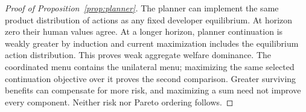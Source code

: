 \begin{proof}[Proof of Proposition~\ref{prop:planner}]
The planner can implement the same product distribution of actions as any fixed developer equilibrium. At horizon zero their human values agree. At a longer horizon, planner continuation is weakly greater by induction and current maximization includes the equilibrium action distribution. This proves weak aggregate welfare dominance. The coordinated menu contains the unilateral menu; maximizing the same selected continuation objective over it proves the second comparison. Greater surviving benefits can compensate for more risk, and maximizing a sum need not improve every component. Neither risk nor Pareto ordering follows.
\end{proof}
